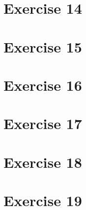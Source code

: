 \documentclass[12pt]{article}
\newcommand{\desc}[1]{\textit{#1} \vspace{1em}}
\begin{document}
\section*{Exercise 14}
\desc{}


\clearpage
\section*{Exercise 15}
\desc{}

\clearpage
\section*{Exercise 16}
\desc{}


\clearpage
\section*{Exercise 17}
\desc{}


\clearpage
\section*{Exercise 18}
\desc{}


\clearpage
\section*{Exercise 19}
\desc{}


\clearpage
\end{document}
